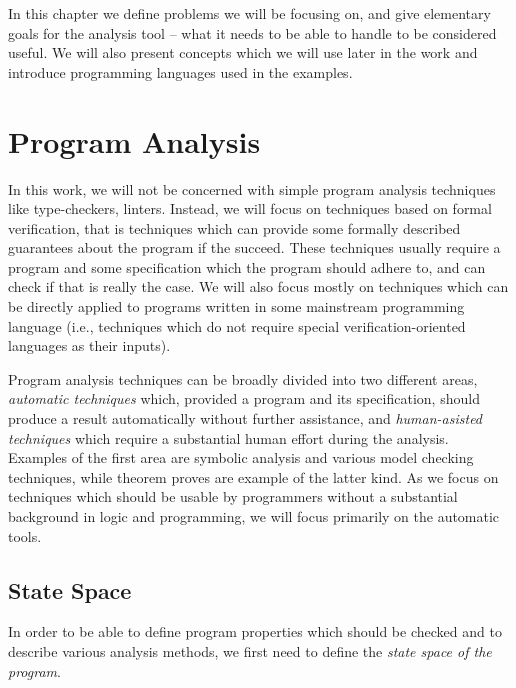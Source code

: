 In this chapter we define problems we will be focusing on, and give elementary goals for the analysis tool -- what it needs to be able to handle to be considered useful.
We will also present concepts which we will use later in the work and introduce programming languages used in the examples.

\section{Program Analysis} %

In this work, we will not be concerned with simple program analysis techniques like type-checkers, linters.
Instead, we will focus on techniques based on formal verification, that is techniques which can provide some formally described guarantees about the program if the succeed.
These techniques usually require a program and some specification which the program should adhere to, and can check if that is really the case.
We will also focus mostly on techniques which can be directly applied to programs written in some mainstream programming language (i.e., techniques which do not require special verification-oriented languages as their inputs).

Program analysis techniques can be broadly divided into two different areas, \emph{automatic techniques} which, provided a program and its specification, should produce a result automatically without further assistance, and \emph{human-asisted techniques} which require a substantial human effort during the analysis.
Examples of the first area are symbolic analysis and various model checking techniques, while theorem proves are example of the latter kind.
As we focus on techniques which should be usable by programmers without a substantial background in logic and programming, we will focus primarily on the automatic tools.


\subsection{State Space}

In order to be able to define program properties which should be checked and to describe various analysis methods, we first need to define the \emph{state space of the program}.


